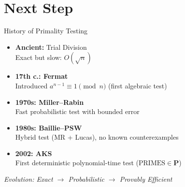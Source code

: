 \documentclass{beamer}
\begin{document}
\section{Next Step}

\begin{frame}{History of Primality Testing}

\begin{itemize}
    \item \textbf{Ancient:} Trial Division \\
    \small Exact but slow: $O(\sqrt{n})$
    
    \vspace{0.5em}
    
    \item \textbf{17th c.: Fermat} \\
    \small Introduced $a^{n-1} \equiv 1 \pmod{n}$ (first algebraic test)
    
    \vspace{0.5em}
    
    \item \textbf{1970s: Miller--Rabin} \\
    \small Fast probabilistic test with bounded error
    
    \vspace{0.5em}
    
    \item \textbf{1980s: Baillie--PSW} \\
    \small Hybrid test (MR + Lucas), no known counterexamples
    
    \vspace{0.5em}
    
    \item \textbf{2002: AKS} \\
    \small First deterministic polynomial-time test ($\text{PRIMES} \in \mathbf{P}$)
\end{itemize}

\vspace{1em}

\centering
\small
\textit{Evolution: Exact $\rightarrow$ Probabilistic $\rightarrow$ Provably Efficient}

\end{frame}
\end{document}
